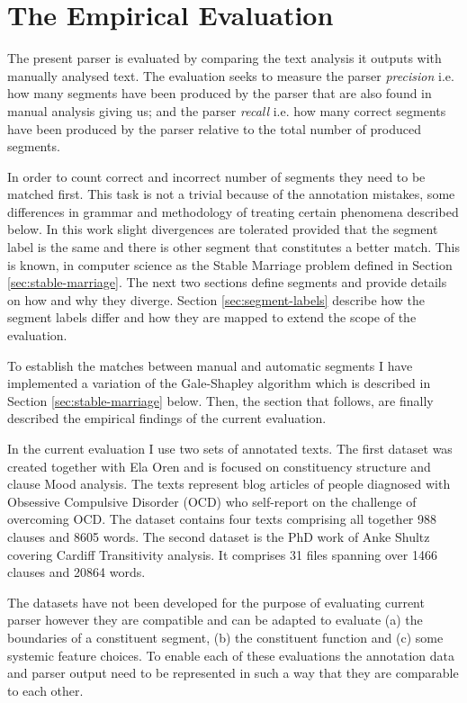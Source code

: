 \chapter{The Empirical Evaluation}
\label{ch:evaluation}

The present parser is evaluated by comparing the text analysis it outputs with manually analysed text. The evaluation seeks to measure the parser \textit{precision} i.e. how many segments have been produced by the parser that are also found in manual analysis giving us; and the parser \textit{recall} i.e. how many correct segments have been produced by the parser relative to the total number of produced segments.

In order to count correct and incorrect number of segments they need to be matched first. This task is not a trivial because of the annotation  mistakes, some differences in grammar and methodology of treating certain phenomena described below. In this work slight divergences are tolerated provided that the segment label is the same and there is other segment that constitutes a better match. This is known, in computer science as the Stable Marriage problem defined in Section \ref{sec:stable-marriage}. The next two sections define segments and provide details on how and why they diverge. Section \ref{sec:segment-labels} describe how the segment labels differ and how they are mapped to extend the scope of the evaluation. 

To establish the matches between manual and automatic segments I have implemented a variation of the Gale-Shapley algorithm \citep{Gale1962} which is described in Section \ref{sec:stable-marriage} below. Then, the section that follows, are finally described the empirical findings of the current evaluation. 

In the current evaluation I use two sets of annotated texts. The first dataset was created together with Ela Oren and is focused on constituency structure and clause Mood analysis. The texts represent blog articles of people diagnosed with Obsessive Compulsive Disorder (OCD) who self-report on the challenge of overcoming OCD. The dataset contains four texts comprising all together 988 clauses and 8605 words. The second dataset is the PhD work of Anke Shultz covering Cardiff Transitivity analysis. It comprises 31 files spanning over 1466 clauses and 20864 words. 

The datasets have not been developed for the purpose of evaluating current parser however they are compatible and can be adapted to evaluate (a) the boundaries of a constituent segment, (b) the constituent function and (c) some systemic feature choices. To enable each of these evaluations the annotation data and parser output need to be represented in such a way that they are comparable to each other.

